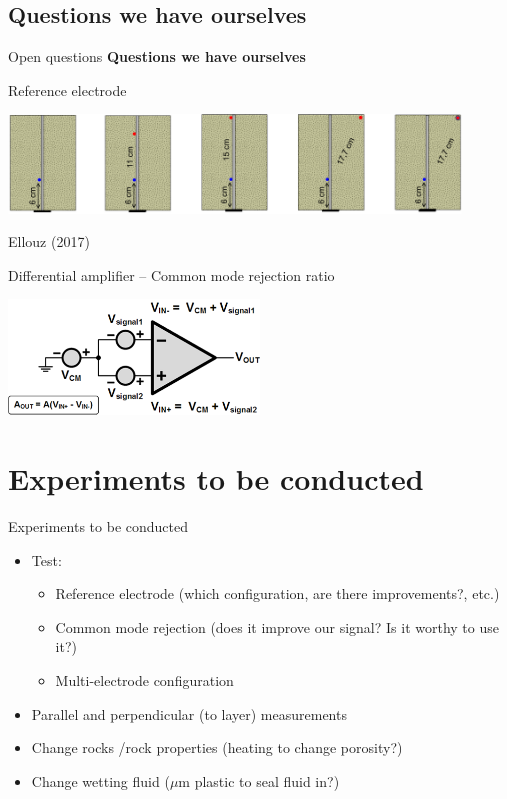 \documentclass[utf8]{beamer} \usetheme{lfcr} %
\begin{document}
\subsection{Questions we have ourselves}
\begin{frame}{Open questions}
  {\textbf{Questions we have ourselves}}

  \begin{block}{\small Reference electrode}

    \vspace*{1.75cm}
    \includegraphics[width=0.9\textwidth]{ref_electrode_config.png}

    \tiny{Ellouz (2017)}
  \end{block}
  \begin{block}{\small Differential amplifier -- Common mode rejection ratio}

    \includegraphics[width=0.5\textwidth]{cmrr.png}
  \end{block}
\end{frame}

%
\section{Experiments to be conducted}
\begin{frame}{Experiments to be conducted}
  \begin{itemize}
    \item {Test:
      \begin{itemize}
        \item Reference electrode (which configuration, are there improvements?, etc.)
        \item Common mode rejection (does it improve our signal? Is it worthy to use it?)
        \item Multi-electrode configuration
      \end{itemize}

      }
    \item Parallel and perpendicular (to layer) measurements
    \item Change rocks /rock properties (heating to change porosity?)
    \item Change wetting fluid ($\mu$m plastic to seal fluid in?)
  \end{itemize}

\end{frame}
%
\end{document}
